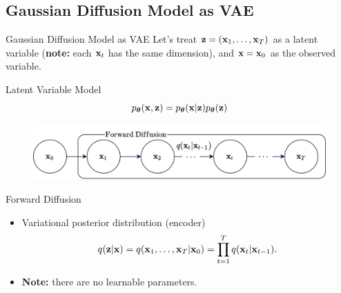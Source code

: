 \documentclass{beamer}
\begin{document}
\subsection{Gaussian Diffusion Model as VAE}
\begin{frame}{Gaussian Diffusion Model as VAE}
    Let's treat $\mathbf{z} = (\mathbf{x}_1, \dots, \mathbf{x}_T)$ as a latent variable (\textbf{note:} each $\mathbf{x}_t$ has the same dimension), and $\mathbf{x} = \mathbf{x}_0$ as the observed variable.
    \begin{block}{Latent Variable Model}
        \vspace{-0.3cm}
        \[
            p_{\boldsymbol{\theta}}(\mathbf{x}, \mathbf{z}) = p_{\boldsymbol{\theta}}(\mathbf{x} | \mathbf{z}) p_{\boldsymbol{\theta}}(\mathbf{z})
        \]    
        \vspace{-0.7cm}
    \end{block}
    \eqpause
    \begin{figure}
        \includegraphics[width=0.8\linewidth]{figs/diffusion_pgm_forward}
    \end{figure}
    \eqpause
    \vspace{-0.3cm}
    \begin{block}{Forward Diffusion}
        \begin{itemize}
            \item Variational posterior distribution (encoder)
            \vspace{-0.3cm}
            \[
                q(\mathbf{z} | \mathbf{x}) = q(\mathbf{x}_1, \dots, \mathbf{x}_T | \mathbf{x}_0) = \prod_{t = 1}^T q(\mathbf{x}_t | \mathbf{x}_{t - 1}).
            \]
            \item \textbf{Note:} there are no learnable parameters.
        \end{itemize}
        \vspace{-0.5cm}
    \end{block}
\end{frame}
\end{document}
